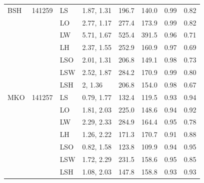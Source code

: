 \begin{table}[htbp]
{\begin{tabular}[t]{llllrrrr}
BSH & 141259 & LS & 1.87, 1.31 & 196.7 & 140.0 & 0.99 & 0.82\\
 &  & LO & 2.77, 1.17 & 277.4 & 173.9 & 0.99 & 0.82\\
 &  & LW & 5.71, 1.67 & 525.4 & 391.5 & 0.96 & 0.71\\
 &  & LH & 2.37, 1.55 & 252.9 & 160.9 & 0.97 & 0.69\\
 &  & LSO & 2.01, 1.31 & 206.8 & 149.1 & 0.98 & 0.73\\
 &  & LSW & 2.52, 1.87 & 284.2 & 170.9 & 0.99 & 0.80\\
 &  & LSH & 2, 1.36 & 206.8 & 154.0 & 0.98 & 0.67\\
\addlinespace
MKO & 141257 & LS & 0.79, 1.77 & 132.4 & 119.5 & 0.93 & 0.94\\
 &  & LO & 1.81, 2.03 & 225.0 & 148.6 & 0.94 & 0.92\\
 &  & LW & 2.29, 2.33 & 284.9 & 164.4 & 0.95 & 0.78\\
 &  & LH & 1.26, 2.22 & 171.3 & 170.7 & 0.91 & 0.88\\
 &  & LSO & 0.82, 1.58 & 123.8 & 109.9 & 0.94 & 0.95\\
 &  & LSW & 1.72, 2.29 & 231.5 & 158.6 & 0.95 & 0.85\\
 &  & LSH & 1.08, 2.03 & 147.8 & 158.8 & 0.93 & 0.93\\
\bottomrule
  \end{tabular}%
  }
\end{table}

